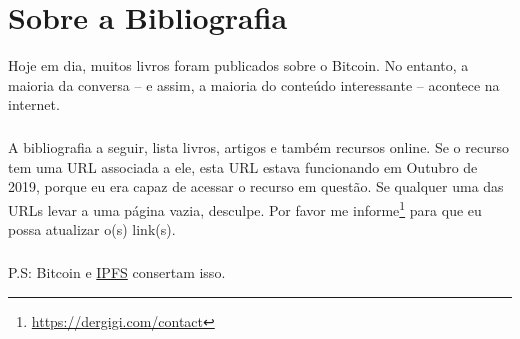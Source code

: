\chapter*{Sobre a Bibliografia}

Hoje em dia, muitos livros foram publicados sobre o Bitcoin. 
No entanto, a maioria da conversa -- e assim, a maioria 
do conteúdo interessante -- acontece na internet.

\paragraph{}
A bibliografia a seguir, lista livros, artigos e também recursos online. 
Se o recurso tem uma URL associada a ele, esta URL estava funcionando em 
Outubro de 2019, porque eu era capaz de acessar o recurso em questão.
Se qualquer uma das URLs levar a uma página vazia, desculpe. Por favor 
me informe\footnote{\url{https://dergigi.com/contact}} para que eu possa atualizar o(s) link(s).

\paragraph{}
P.S: Bitcoin e \href{https://ipfs.io/}{IPFS} consertam isso.

